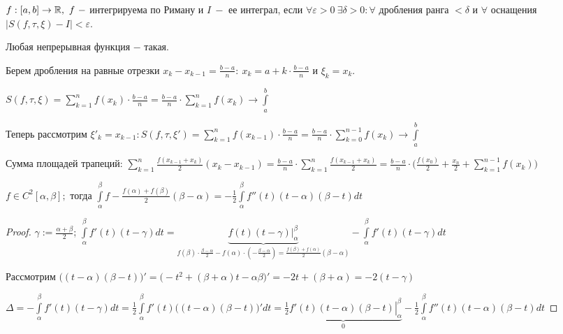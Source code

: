 \begin{definition}
    $f:[a,b]\rightarrow \mathbb{R},\ f\ -$ интегрируема по Риману и $I\ -$ ее интеграл, если $\forall \varepsilon >0\ \exists\delta>0:\forall$ дробления ранга $<\delta$ и $\forall$ оснащения $\bigg|S(f,\tau, \xi) - I\bigg|<\varepsilon$.
\end{definition}

\begin{remark}
    Любая непрерывная функция $-$ такая.
\end{remark}

\begin{remark}
    Берем дробления на равные отрезки $x_k-x_{k-1}=\frac{b-a}{n}:\ x_k=a+k\cdot \frac{b-a}{n}$ и $\xi_k=x_k$.

    $S(f,\tau, \xi)=\sum\limits_{k=1}^nf(x_k)\cdot\frac{b-a}{n}=\frac{b-a}{n}\cdot \sum\limits_{k=1}^nf(x_k)\rightarrow \int\limits_a^b$

    Теперь рассмотрим $\xi'_k=x_{k-1}:S(f,\tau, \xi')=\sum\limits_{k=1}^nf(x_{k-1})\cdot\frac{b-a}{n}=\frac{b-a}{n}\cdot \sum\limits_{k=0}^{n-1}f(x_k)\rightarrow \int\limits_a^b$

    Сумма площадей трапеций: $\sum\limits_{k=1}^n\frac{f(x_{k-1}+x_k)}{2}(x_k-x_{k-1})=\frac{b-a}{n}\cdot \sum\limits_{k=1}^n\frac{f(x_{k-1}+x_k)}{2}
    =\frac{b-a}{n}\cdot\bigg(\frac{f(x_0)}{2}+\frac{x_n}{2}+\sum\limits_{k=1}^{n-1}f(x_k)\bigg)$
\end{remark}

\begin{lemma}
    $f\in C^2[\alpha, \beta];$ тогда $\int\limits_\alpha^\beta f-\frac{f(\alpha)+f(\beta)}{2}(\beta-\alpha)=-\frac{1}{2}\int\limits_\alpha^\beta f''(t)(t-\alpha)(\beta-t)dt$
\end{lemma}

\begin{proof}
    $\gamma := \frac{\alpha + \beta}{2}$; $\int\limits_\alpha^\beta f'(t)(t-\gamma)dt=\underbrace{\left. f(t)(t-\gamma)\right|^\beta_\alpha}_{f(\beta)\cdot\frac{\beta-\alpha}{2}-f(\alpha)\cdot(-\frac{\beta-\alpha}{2})=\frac{f(\beta)+f(\alpha)}{2}(\beta-\alpha)} -\int\limits_\alpha^\beta f'(t)(t-\gamma)dt$

    Рассмотрим $\bigg((t-\alpha)(\beta-t)\bigg)'=\bigg(-t^2+(\beta+\alpha)t-\alpha\beta\bigg)'=-2t+(\beta+\alpha)=-2(t-\gamma)$

    $\Delta=-\int\limits_\alpha^\beta f'(t)(t-\gamma)dt
    =\frac{1}{2}\int\limits_\alpha^\beta f'(t)\bigg((t-\alpha)(\beta-t)\bigg)'dt
    =\underbrace{\left.\frac{1}{2}f'(t)(t-\alpha)(\beta-t)\right|^\beta_\alpha}_{0}-\frac{1}{2}\int\limits_\alpha^\beta f''(t)(t-\alpha)(\beta-t)dt$
\end{proof}

